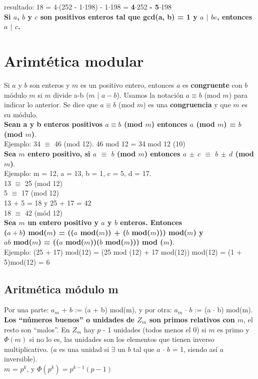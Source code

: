 \documentclass{article}
\begin{document}
resultado: 18 = 4$\cdot$(252 - 1$\cdot$198) - 1$\cdot$198 = \textbf{4}$\cdot$252 \textbf{- 5}$\cdot$198 \\

\textbf{Si $a$, $b$ y $c$ son positivos enteros tal que gcd(a, b) = 1 y $a$ $|$ $bc$, entonces $a$ $|$ $c$.}

\newpage

\section{Arimtética modular}
Si $a$ y $b$ son enteros y $m$ es un positivo entero, entonces $a$ es \textbf{congruente} con $b$ módulo $m$ si $m$ divide a-b ($m$ $|$ $a-b$). Usamos la notación $a \equiv b$ (mod $m$) para indicar lo anterior. Se dice que $a \equiv b$ (mod $m$) es una \textbf{congruencia} y que $m$ es su módulo. \\

\textbf{Sean a y b enteros positivos $a \equiv b$ (mod $m$) entonces $a$ (mod $m$) = $b$ (mod $m$)}. \\
Ejemplo: 34 $\equiv$ 46 (mod 12). 46 mod 12 = 34 mod 12 (10) \\

\textbf{Sea $m$ entero positivo, si $a$ $\equiv$ $b$ (mod $m$) entonces $a$ $\pm$ $c$ $\equiv$ $b$ $\pm$ $d$ (mod $m$)}. \\
Ejemplo: m = 12, a = 13, b = 1, c = 5, d = 17.\\
13 $\equiv$ 25 (mod 12) \\
5 $\equiv$ 17 (mod 12) \\
13 + 5 = 18 y 25 + 17 = 42 \\
18 $\equiv$ 42 (mód 12) \\

\textbf{Sea $m$ un entero positivo y $a$ y $b$ enteros. Entonces \\
($a+b$) mod($m$) = (($a$ mod($m$)) + ($b$ mod($m$))) mod($m$) y \\
$ab$ mod($m$) = (($a$ mod($m$))($b$ mod($m$))) mod ($m$)}. \\
Ejemplo: (25 + 17) mod(12) = (25 mod (12) + 17 mod(12)) mod(12) = (1 + 5)mod(12) = 6 

\subsection{Aritmética módulo m}
Por una parte: $a_m$ + $b$ := (a + b) mod(m), y por otra: $a_m$ $\cdot$ $b$ := (a $\cdot$ b) mod(m). \\
\textbf{Los “números buenos” o unidades de $Z_m$ son primos relativos con $m$}, el resto son “malos”. En $Z_m$ hay $p$ - 1 unidades (todos menos el 0) si $m$ es primo y $\varPhi (m)$ si no lo es, las unidades son los elementos que tienen inverso multiplicativo. ($a$ es una unidad si $\exists$ un $b$ tal que $a$ $\cdot$ $b$ = 1, siendo así $a$ inversible). \\
$m$ = $p^k$, y $\varPhi (p^k) = p^{k-1}(p-1)$ \\
\end{document}
